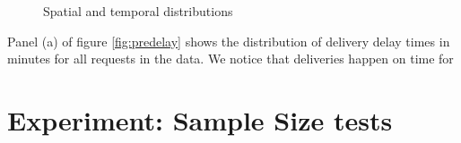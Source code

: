 \begin{figure}[h]
	\centering
	\caption{Spatial and temporal distributions}
	\label{fig:prepdelay}
\end{figure}

Panel (a) of figure \ref{fig:predelay} shows the distribution of delivery delay times in minutes for all requests in the data. We notice that deliveries happen on time for 


 
\section{Experiment: Sample Size tests}



